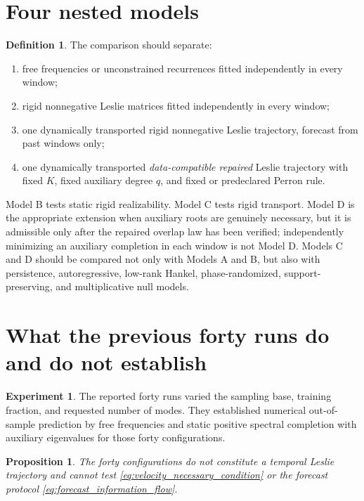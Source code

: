 \documentclass[11pt]{amsart}
\numberwithin{equation}{section}
\theoremstyle{plain}
\newtheorem{proposition}[theorem]{Proposition}
\theoremstyle{definition}
\newtheorem{definition}[theorem]{Definition}
\newtheorem{experiment}[theorem]{Experiment}
\theoremstyle{remark}
\begin{document}
\section{Four nested models}
\label{sec:nested_models}

\begin{definition}
\label{def:models_abcd}
The comparison should separate:
\begin{enumerate}
\item[Model A.] free frequencies or unconstrained recurrences fitted independently in every window;
\item[Model B.] rigid nonnegative Leslie matrices fitted independently in every window;
\item[Model C.] one dynamically transported rigid nonnegative Leslie trajectory, forecast from past windows only;
\item[Model D.] one dynamically transported \emph{data-compatible repaired} Leslie trajectory with fixed $K$, fixed auxiliary degree $q$, and fixed or predeclared Perron rule.
\end{enumerate}
\end{definition}

Model B tests static rigid realizability. Model C tests rigid transport. Model D is the appropriate extension when auxiliary roots are genuinely necessary, but it is admissible only after the repaired overlap law has been verified; independently minimizing an auxiliary completion in each window is not Model D. Models C and D should be compared not only with Models A and B, but also with persistence, autoregressive, low-rank Hankel, phase-randomized, support-preserving, and multiplicative null models.

\section{What the previous forty runs do and do not establish}
\label{sec:forty_runs}

\begin{experiment}
\label{exp:previous_runs}
The reported forty runs varied the sampling base, training fraction, and requested number of modes.  They established numerical out-of-sample prediction by free frequencies and static positive spectral completion with auxiliary eigenvalues for those forty configurations.
\end{experiment}

\begin{proposition}
\label{prop:runs_not_trajectory}
The forty configurations do not constitute a temporal Leslie trajectory and cannot test \eqref{eq:velocity_necessary_condition} or the forecast protocol \eqref{eq:forecast_information_flow}.
\end{proposition}
\end{document}
